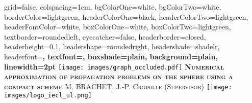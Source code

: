 \documentclass[portrait,final,a0paper,fontscale=0.34]{baposter}%
\begin{document}



\begin{poster}%
  {
  grid=false,
  colspacing=1em,
  bgColorOne=white,
  bgColorTwo=white,
  borderColor=lightgreen,
  headerColorOne=black,
  headerColorTwo=lightgreen,
  headerFontColor=white,
  boxColorOne=white,
  boxColorTwo=lightgreen,
  textborder=roundedleft,
  eyecatcher=false,
  headerborder=closed,
  headerheight=0.1\textheight,
  headershape=roundedright,
  headershade=shadelr,
  headerfont=\Large\bf\textsc, %
  textfont={\setlength{\parindent}{1.5em}},
  boxshade=plain,
  background=plain,
  linewidth=2pt
  }
  {\texttt{[image: images/graph\_occluded.pdf]}} 
  {\bf\textsc{Numerical approximation of propagation problems on the sphere using a compact scheme}\vspace{0.4em}}
  {\textsc{ M. BRACHET, J.-P. Croisille (Supervisor)}}
  {%
    \texttt{[image: images/logo\_iecl\_ul.png]}
  }


    \newcommand{\colouredcircle}{%
      \tikz{\useasboundingbox (-0.2em,-0.32em) rectangle(0.2em,0.32em); \draw[draw=black,fill=lightblue,line width=0.03em] (0,0) circle(0.18em);}}


\end{poster}
\end{document}
